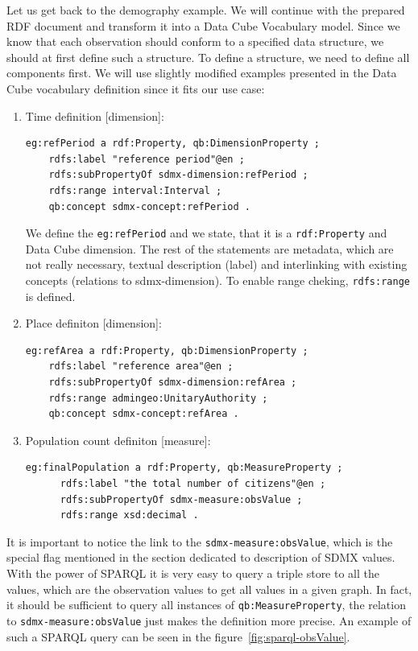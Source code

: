 Let us get back to the demography example. We will continue with the prepared RDF
document and transform it into a Data Cube Vocabulary model. Since we know that each
observation should conform to a specified data structure, we should at first define
such a structure. To define a structure, we need to define all components first.
We will use slightly modified examples presented in the Data Cube vocabulary
definition since it fits our use case:

\begin{enumerate}
\item Time definition [dimension]:

\begin{verbatim}
eg:refPeriod a rdf:Property, qb:DimensionProperty ;
    rdfs:label "reference period"@en ;
    rdfs:subPropertyOf sdmx-dimension:refPeriod ;
    rdfs:range interval:Interval ;
    qb:concept sdmx-concept:refPeriod .
\end{verbatim}

We define the \texttt{eg:refPeriod} and we state, that it is a \texttt{rdf:Property} and Data Cube dimension.
The rest of the statements are metadata, which are not really necessary, textual description
(label) and interlinking with existing concepts (relations to sdmx-dimension). To enable range
cheking, \texttt{rdfs:range} is defined.

\item Place definiton [dimension]:

\begin{verbatim}
eg:refArea a rdf:Property, qb:DimensionProperty ;
    rdfs:label "reference area"@en ;
    rdfs:subPropertyOf sdmx-dimension:refArea ;
    rdfs:range admingeo:UnitaryAuthority ;
    qb:concept sdmx-concept:refArea .
\end{verbatim}

\item Population count definiton [measure]:
\begin{verbatim}
eg:finalPopulation a rdf:Property, qb:MeasureProperty ;
      rdfs:label "the total number of citizens"@en ;
      rdfs:subPropertyOf sdmx-measure:obsValue ;
      rdfs:range xsd:decimal .
\end{verbatim}
\end{enumerate}

It is important to notice the link to the \texttt{sdmx-measure:obsValue}, which is the special flag
mentioned in the section dedicated to description of SDMX values. With the power of SPARQL
it is very easy to query a triple store to all the values, which are the observation values to get
all values in a given graph. In fact, it should be sufficient to query all instances of
\texttt{qb:MeasureProperty}, the relation to \texttt{sdmx-measure:obsValue} just makes the definition
more precise. An example of such a SPARQL query can be seen in the 
figure~\ref{fig:sparql-obsValue}.

